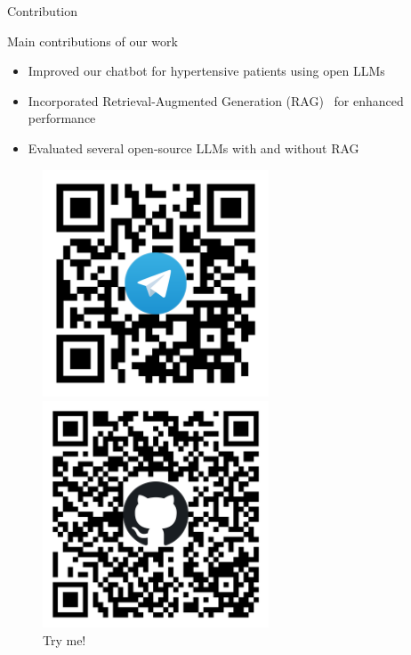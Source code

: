 \documentclass[handout]{beamer}\mode<handout>{\usetheme{AMSBolognaFC}}
\begin{document}
\begin{frame}{Contribution}

    \begin{block}{Main contributions of our work}
        \begin{itemize}
            \item Improved our chatbot for hypertensive patients using \alert{open LLMs}
            \item Incorporated \alert{Retrieval-Augmented Generation (RAG)}~ for enhanced performance
            \item \alert{Evaluated} several open-source LLMs with and without RAG
        \end{itemize}
    \end{block}
    \vfill
    \begin{figure}
        \begin{minipage}{0.3\textwidth}
            \centering
            \includegraphics[width=0.6\textwidth]{figures/telegram-bot}
            \caption{Try me!}
        \end{minipage}
        \hspace{0.2cm}
        \begin{minipage}{0.3\textwidth}
            \centering
            \includegraphics[width=0.6\textwidth]{figures/github-repo}

\end{minipage}
\end{figure}
\end{frame}
\end{document}
